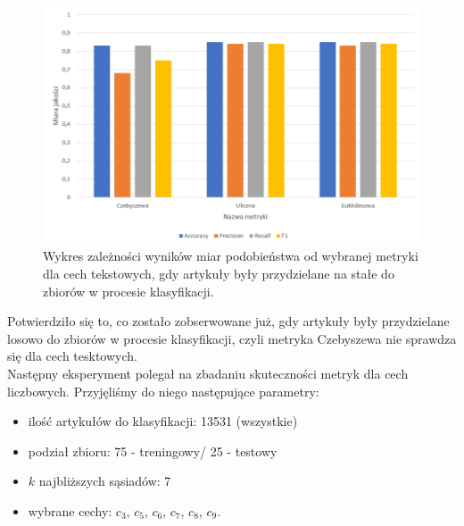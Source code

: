 \documentclass{classrep}
\begin{document}
\begin{figure}[H]
    \centering
    \includegraphics[width=14cm]{wykres_metryki1_const.png}
    \caption{Wykres zależności wyników miar podobieństwa od wybranej metryki dla cech tekstowych, gdy artykuły były przydzielane na stałe do zbiorów w procesie klasyfikacji.}
        \label{wykres:metryka_tekstowe_const}
\end{figure}
Potwierdziło się to, co zostało zobserwowane już, gdy artykuły były przydzielane losowo do zbiorów w procesie klasyfikacji, czyli metryka Czebyszewa nie sprawdza się dla cech tesktowych.\\
\indent Następny eksperyment polegał na zbadaniu skuteczności metryk dla cech liczbowych. Przyjęliśmy do niego następujące parametry:
\begin{itemize}
    \item ilość artykułów do klasyfikacji: 13531 (wszystkie)
    \item podział zbioru: 75 - treningowy/ 25 - testowy
    \item $k$ najbliższych sąsiadów: 7
    \item wybrane cechy: $c_3$, $c_5$, $c_6$, $c_7$, $c_8$, $c_9$.
\end{itemize}
\end{document}
